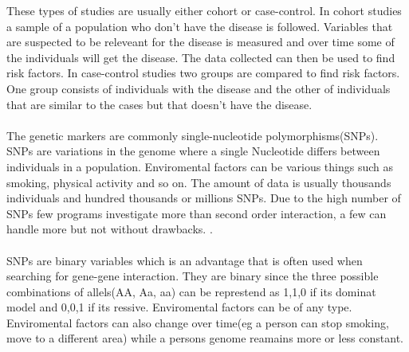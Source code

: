 \documentclass[10pt,a4paper]{article}
\begin{document}
These types of studies are usually either cohort or case-control. In cohort studies a sample of a population who don't have the disease is followed. Variables that are suspected to be releveant for the disease is measured and over time some of the individuals will get the disease. The data collected can then be used to find risk factors. In case-control studies two groups are compared to find risk factors. One group consists of individuals with the disease and the other of individuals that are similar to the cases but that doesn't have the disease. \cite{rothman1998modern,mann_observational}\\
\\
The genetic markers are commonly single-nucleotide polymorphisms(SNPs). SNPs are variations in the genome where a single Nucleotide differs between individuals in a population\cite{fareed_snp}. Enviromental factors can be various things such as smoking, physical activity and so on. The amount of data is usually thousands individuals and hundred thousands or millions SNPs. Due to the high number of SNPs few programs investigate more than second order interaction, a few can handle more but not without drawbacks. \cite{gwis,high_order_2012,fast_high_order_cluster}.\\
\\
SNPs are binary variables which is an advantage that is often used when searching for gene-gene interaction. They are binary since the three possible combinations of allels(AA, Aa, aa)  can be represtend as 1,1,0 if its dominat model and 0,0,1 if its ressive\cite{}. Enviromental factors can be of any type\cite{gene_enviroment_2013}. Enviromental factors can also change over time(eg a person can stop smoking, move to a different area) while a persons genome reamains more or less constant.
\end{document}
